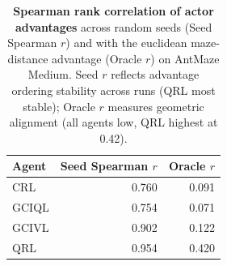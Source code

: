 
\begin{table}[h]
    \begin{tabular}{lrr}
    \toprule
    Agent & Seed Spearman $r$ & Oracle $r$ \\
    \midrule
    CRL   & 0.760 & 0.091 \\
    GCIQL & 0.754 & 0.071 \\
    GCIVL & 0.902 & 0.122 \\
    QRL   & 0.954 & 0.420 \\
    \bottomrule
    \end{tabular}
    \vspace{0.5em}
    \caption{\textbf{Spearman rank correlation of actor advantages} across random seeds (Seed Spearman $r$) and with the euclidean maze-distance advantage (Oracle $r$) on AntMaze Medium. Seed $r$ reflects advantage ordering stability across runs (QRL most stable); Oracle $r$ measures geometric alignment (all agents low, QRL highest at 0.42).}
    \label{tab:adv_corr}
\end{table}

